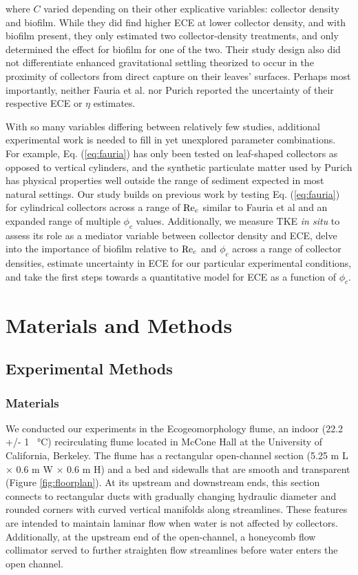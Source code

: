 \documentclass[geosciences,article,submit,moreauthors,pdftex]{Definitions/mdpi}
\begin{document}
\noindent where $C$ varied depending on their other explicative variables: collector density and biofilm. While they did find higher ECE at lower collector density, and with biofilm present, they only estimated two collector-density treatments, and only determined the effect for biofilm for one of the two. Their study design also did not differentiate enhanced gravitational settling theorized to occur in the proximity of collectors from direct capture on their leaves' surfaces. Perhaps most importantly, neither Fauria et al. nor Purich reported the uncertainty of their respective ECE or $\eta$ estimates.

With so many variables differing between relatively few studies, additional experimental work is needed to fill in yet unexplored parameter combinations. For example, Eq. (\ref{eq:fauria}) has only been tested on leaf-shaped collectors as opposed to vertical cylinders, and the synthetic particulate matter used by Purich \cite{purich2006capture} has physical properties well outside the range of sediment expected in most natural settings. Our study builds on previous work by testing Eq. (\ref{eq:fauria}) for cylindrical collectors across a range of $\mathrm{Re}_c$ similar to Fauria et al \cite{Fauria_2015} and an expanded range of multiple $\phi_c$ values. Additionally, we measure TKE \textit{in situ} to assess its role as a mediator variable between collector density and ECE, delve into the importance of biofilm relative to $\mathrm{Re}_c$ and $\phi_c$ across a range of collector densities, estimate uncertainty in ECE for our particular experimental conditions, and take the first steps towards a quantitative model for ECE as a function of $\phi_c$.

\section{Materials and Methods}

\subsection{Experimental Methods}

\subsubsection{Materials}

We conducted our experiments in the Ecogeomorphology flume, an indoor (22.2 +/- 1 \SI{}{\celsius}) recirculating flume located in McCone Hall at the University of California, Berkeley. The flume has a rectangular open-channel section (5.25 m L $\times$ 0.6 m W $\times$ 0.6 m H) and a bed and sidewalls that are smooth and transparent (Figure \ref{fig:floorplan}). At its upstream and downstream ends, this section connects to rectangular ducts with gradually changing hydraulic diameter and rounded corners with curved vertical manifolds along streamlines. These features are intended to maintain laminar flow when water is not affected by collectors. Additionally, at the upstream end of the open-channel, a honeycomb flow collimator served to further straighten flow streamlines before water enters the open channel. 
\end{document}
